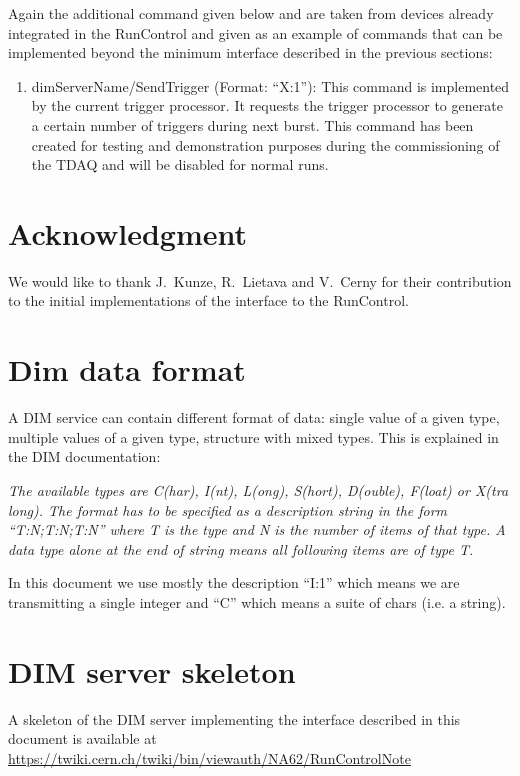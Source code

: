 \documentclass[a4paper]{article}
\begin{document}
Again the additional command given below and are taken from devices already
integrated in the RunControl and given as an example of commands that can be
implemented beyond the minimum interface described in the previous sections:
\begin{enumerate}[label=\textbf{ACMD.\arabic*}]
	\item dimServerName/SendTrigger (Format: ``X:1''): This command is implemented
	by the current trigger processor. It requests the trigger processor to
	generate a certain number of triggers during next burst. This command has been
	created for testing and demonstration purposes during the commissioning of the
	TDAQ and will be disabled for normal runs.
\end{enumerate}

\section{Acknowledgment}
We would like to thank J.~Kunze, R.~Lietava and V.~Cerny for their contribution to the initial
implementations of the interface to the RunControl.

\appendix
\appendixpage
\section{Dim data format}\label{app:dimFormat}
%
A DIM service can contain different format of data: single value of a given
type, multiple values of a given type, structure with mixed types. This is
explained in the DIM documentation\cite{biblio:DIM}:

\textit{The available types are C(har), I(nt), L(ong), S(hort), D(ouble),
F(loat) or X(tra long). The format has to be specified as a description string in the form
``T:N;T:N;T:N'' where T is the type and N is the number of items of that type.
A data type alone at the end of string means all following items are of type T.}

In this document we use mostly the description ``I:1'' which means we are
transmitting a single integer and ``C'' which means a suite of chars (i.e. a
string).

\section{DIM server skeleton}\label{app:skeleton}
A skeleton of the DIM server implementing the interface described in this document is available at
\url{https://twiki.cern.ch/twiki/bin/viewauth/NA62/RunControlNote}
\end{document}
